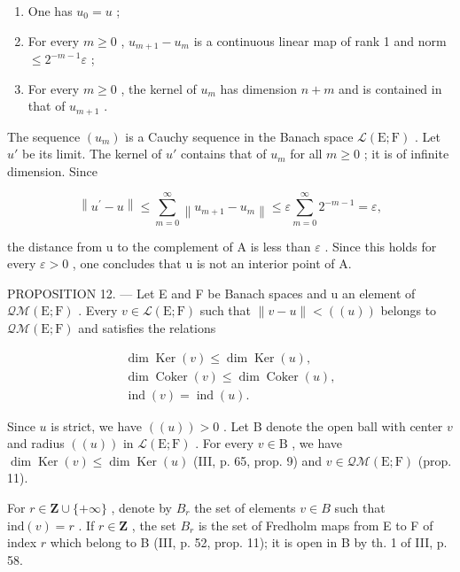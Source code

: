 \begin{enumerate}
\def\labelenumi{(\roman{enumi})}
\item
  One has \(u_{0}=u\) ;
\item
  For every \(m \geqslant 0\) , \(u_{m+1} - u_m\) is a continuous linear map of rank 1 and norm \(\leqslant 2^{-m-1}\varepsilon\) ;
\item
  For every \(m \geqslant 0\) , the kernel of \(u_m\) has dimension \(n + m\) and is contained in that of \(u_{m+1}\) .
\end{enumerate}

The sequence \((u_{m})\) is a Cauchy sequence in the Banach space \(\mathcal{L}(\mathrm{E};\mathrm{F})\) . Let \(u'\) be its limit. The kernel of \(u'\) contains that of \(u_{m}\) for all \(m \geqslant 0\) ; it is of infinite dimension. Since

\[
\left\| u ^ {\prime} - u \right\| \leqslant \sum_ {m = 0} ^ {\infty} \left\| u _ {m + 1} - u _ {m} \right\| \leqslant \varepsilon \sum_ {m = 0} ^ {\infty} 2 ^ {- m - 1} = \varepsilon ,
\]

the distance from u to the complement of A is less than \(\varepsilon\) . Since this holds for every \(\varepsilon > 0\) , one concludes that u is not an interior point of A.

PROPOSITION 12. --- Let E and F be Banach spaces and u an element of \(\mathcal{Q}\mathcal{M}(\mathrm{E};\mathrm{F})\) . Every \(v \in \mathcal{L}(\mathrm{E};\mathrm{F})\) such that \(\|v - u\| < ((u))\) belongs to \(\mathcal{Q}\mathcal{M}(\mathrm{E};\mathrm{F})\) and satisfies the relations

\[
\begin{array}{c} \dim \operatorname{Ker} (v) \leqslant \dim \operatorname{Ker} (u), \\ \dim \operatorname{Coker} (v) \leqslant \dim \operatorname{Coker} (u), \\ \operatorname{ind} (v) = \operatorname{ind} (u). \end{array}
\]

Since \(u\) is strict, we have \(((u)) > 0\) . Let B denote the open ball with center \(v\) and radius \(((u))\) in \(\mathcal{L}(\mathrm{E};\mathrm{F})\) . For every \(v \in \mathrm{B}\) , we have \(\dim \operatorname{Ker}(v) \leqslant \dim \operatorname{Ker}(u)\) (III, p. 65, prop. 9) and \(v \in \mathcal{Q}\mathcal{M}(\mathrm{E};\mathrm{F})\) (prop. 11).

For \(r \in \mathbf{Z} \cup \{+\infty\}\) , denote by \(B_r\) the set of elements \(v \in B\) such that \(\text{ind}(v) = r\) . If \(r \in \mathbf{Z}\) , the set \(B_r\) is the set of Fredholm maps from E to F of index \(r\) which belong to B (III, p. 52, prop. 11); it is open in B by th. 1 of III, p. 58.

